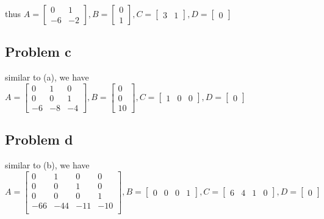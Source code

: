\documentclass[12pt,a4paper]{article}
\begin{document}
thus
$
    A =
    \begin{bmatrix}
        0  & 1  \\
        -6 & -2
    \end{bmatrix},
    B =
    \begin{bmatrix}
        0 \\
        1
    \end{bmatrix},
    C = \begin{bmatrix}
        3 & 1
    \end{bmatrix},
    D =
    \begin{bmatrix}
        0
    \end{bmatrix}
$

\subsection{Problem c}
similar to (a), we have
$
A = \begin{bmatrix}
    0  & 1 & 0  \\
    0 & 0 & 1 \\
    -6 & -8 & -4
\end{bmatrix},
B = \begin{bmatrix}
    0 \\
    0 \\
    10
\end{bmatrix},
C = \begin{bmatrix}
    1 & 0 &0
\end{bmatrix},
D = \begin{bmatrix}
    0
\end{bmatrix}
$

\subsection{Problem d}
similar to (b), we have
$
A = \begin{bmatrix}
    0 & 1 & 0 & 0 \\
    0 & 0 & 1 & 0 \\
    0 & 0 & 0 & 1 \\
    -66 & -44 & -11 & -10 \\
\end{bmatrix},
B= \begin{bmatrix}
    0 &0 &0 &1
\end{bmatrix},
C= \begin{bmatrix}
    6 & 4 & 1 & 0
\end{bmatrix},
D = \begin{bmatrix}
    0
\end{bmatrix}
$
\end{document}
